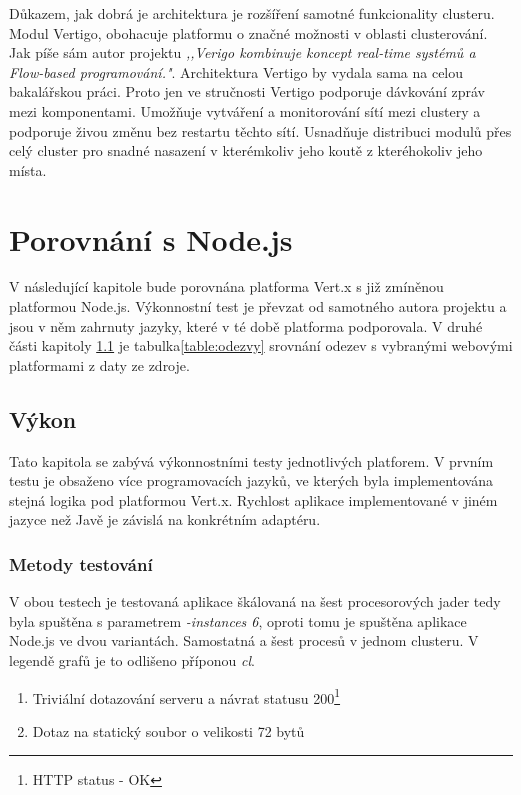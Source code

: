 Důkazem, jak dobrá je architektura je rozšíření samotné funkcionality clusteru. Modul Vertigo\cite{vertigo}, obohacuje platformu o značné možnosti v oblasti clusterování. Jak píše sám autor projektu \emph{,,Verigo kombinuje koncept real-time systémů a Flow-based programování."}. Architektura Vertigo by vydala sama na celou bakalářskou práci. Proto jen ve stručnosti Vertigo podporuje dávkování zpráv mezi komponentami. Umožňuje vytváření a monitorování sítí mezi clustery a podporuje živou změnu bez restartu těchto sítí. Usnadňuje distribuci modulů přes celý cluster pro snadné nasazení v kterémkoliv jeho koutě z kteréhokoliv jeho místa.

\section{Porovnání s Node.js}

V následující kapitole bude porovnána platforma Vert.x s již zmíněnou platformou Node.js. Výkonnostní test\cite{benchmarkTim} je převzat od samotného autora projektu a jsou v něm zahrnuty jazyky, které v té době platforma podporovala. V druhé části kapitoly \ref{sub:performence} je tabulka\ref{table:odezvy} srovnání odezev s vybranými webovými platformami z daty ze zdroje\cite{benchmark}.

\subsection{Výkon}\label{sub:performence}

Tato kapitola se zabývá výkonnostními testy jednotlivých platforem. V prvním testu je obsaženo více programovacích jazyků, ve kterých byla implementována stejná logika pod platformou Vert.x. Rychlost aplikace implementované v jiném jazyce než Javě je závislá na konkrétním adaptéru.

\subsubsection{Metody testování}

V obou testech je testovaná aplikace škálovaná na šest procesorových jader tedy byla spuštěna s parametrem \emph{-instances 6}, oproti tomu je spuštěna aplikace Node.js ve dvou variantách. Samostatná a šest procesů v jednom clusteru. V legendě grafů je to odlišeno příponou \emph{cl}.

\begin{enumerate}
\item{Triviální dotazování serveru a návrat statusu 200\footnote{HTTP status - OK}}
\item{Dotaz na statický soubor o velikosti 72 bytů}
\end{enumerate}

